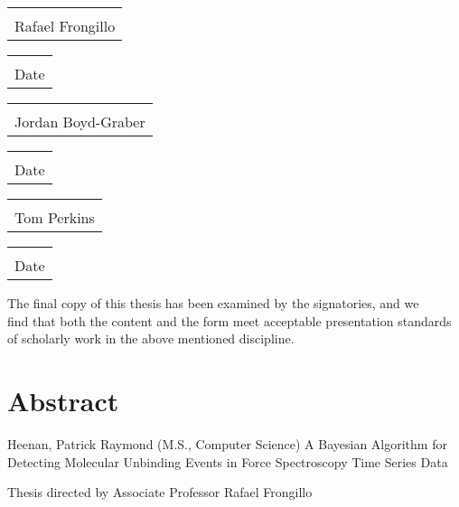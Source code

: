 \documentclass[%
  aip,12pt,tightenlines,
  amsthm,
 amsmath,amssymb
]{article}
\makeatletter
\newcommand{\firstp}[0]{}
\newcommand{\titledate}[2][2in]{%
  \noindent%
  \begin{tabular}{@{}p{#1}@{}}
    \\ \hline \\[-.75\normalbaselineskip]
    #2
  \end{tabular} \hspace{1in}
  \begin{tabular}{@{}p{#1}@{}}
    \\ \hline \\[-.75\normalbaselineskip]
    Date
  \end{tabular}
}
\newcommand{\name}[0]{Feather}
\newcommand{\acronym}[0]{\textbf{F}orce \textbf{E}xtension \textbf{A}nalysis using a \textbf{T}estable \textbf{H}ypothesis for \textbf{E}vent \textbf{R}ecognition}
\newcommand{\TitleName}[0]{A Bayesian Algorithm for Detecting Molecular Unbinding Events in Force Spectroscopy Time Series Data}
\newcommand{\singlemol}[0]{SMFS}
\makeatother
\begin{document}
\begin{center}

\titledate{Rafael Frongillo}

\leavevmode \newline  \newline

\titledate{Jordan Boyd-Graber}

\leavevmode \newline  \newline

\titledate{Tom Perkins}

\leavevmode \newline \newline \newline 
The final copy of this thesis has been examined by the signatories, and we\\
find that both the content and the form meet acceptable presentation standards\\
of scholarly work in the above mentioned discipline.

\end{center}


\clearpage


\section{Abstract}

\noindent Heenan, Patrick Raymond (M.S., Computer Science) \newline
\hangindent=0.75cm \TitleName{} \par
\noindent Thesis directed by Associate Professor Rafael Frongillo \newline


\begin{abstract}
\firstp In a Single Molecule Force Spectroscopy (\singlemol{}) experiment, mechanical forces are applied to individual biomolecules via a force probe such as an optical trap or an atomic force microscope (AFM). In \singlemol{} unfolding experiments, the molecule of interest is pulled apart and force is measured as a function of probe position relative to a relaxed state. Although these unfolding experiments are capable of measuring a wide class of molecular phenomena, interpreting \singlemol{} data is hindered by identifying where unfolding events occur. This paper introduces a new algorithm, \name{} (\acronym), for identifying the locations of molecular unfolding events. Relative to two other event-detection algorithms on an annotated data set, \name{} features a median event localization error of 4nm, a 100-fold improvement, and a Bhattacharyya coefficient of 0.96, an improvement of 0.4, for the joint probability distribution of event loading rates and rupture forces. As a linear-time algorithm for reproducible event identification, \name{} improves the quality of analysis of \singlemol{} data.
\end{abstract}
\end{document}

